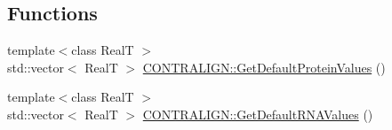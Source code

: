 \subsection*{Functions}
\begin{DoxyCompactItemize}
\item 
{\footnotesize template$<$class Real\+T $>$ }\\std\+::vector$<$ Real\+T $>$ \hyperlink{namespace_c_o_n_t_r_a_l_i_g_n_af16f9793f865b3059ac02c8127cccb62}{C\+O\+N\+T\+R\+A\+L\+I\+G\+N\+::\+Get\+Default\+Protein\+Values} ()
\item 
{\footnotesize template$<$class Real\+T $>$ }\\std\+::vector$<$ Real\+T $>$ \hyperlink{namespace_c_o_n_t_r_a_l_i_g_n_af0f740c7a84dffe3866c40f17e13b5f8}{C\+O\+N\+T\+R\+A\+L\+I\+G\+N\+::\+Get\+Default\+R\+N\+A\+Values} ()
\end{DoxyCompactItemize}
